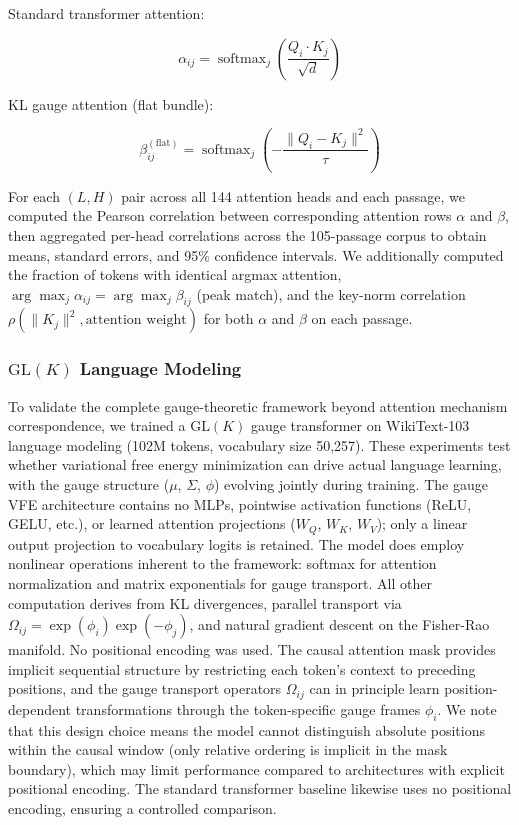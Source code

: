 \documentclass[twoside,11pt]{article}
\begin{document}
Standard transformer attention:

\begin{equation}
\alpha_{ij} = \operatorname{softmax}_j\!\left( \frac{Q_i \cdot K_j}{\sqrt{d}} \right)
\end{equation}

KL gauge attention (flat bundle):

\begin{equation}
\beta^{(\mathrm{flat})}_{ij} = \operatorname{softmax}_j\!\left( -\frac{\|Q_i - K_j\|^2}{\tau} \right)
\end{equation}

For each $(L,H)$ pair across all 144 attention heads and each passage, we computed the Pearson correlation between corresponding attention rows $\alpha$ and $\beta$, then aggregated per-head correlations across the 105-passage corpus to obtain means, standard errors, and 95\% confidence intervals. We additionally computed the fraction of tokens with identical argmax attention, $\arg\max_j \alpha_{ij} = \arg\max_j \beta_{ij}$ (peak match), and the key-norm correlation $\rho(\|K_j\|^2, \text{attention weight})$ for both $\alpha$ and $\beta$ on each passage.

\subsubsection{$\mathrm{GL}(K)$ Language Modeling}
\label{sec:experimental_design_glk}

To validate the complete gauge-theoretic framework beyond attention mechanism correspondence, we trained a $\mathrm{GL}(K)$ gauge transformer on WikiText-103 language modeling (102M tokens, vocabulary size 50,257). These experiments test whether variational free energy minimization can drive actual language learning, with the gauge structure ($\mu$, $\Sigma$, $\phi$) evolving jointly during training. The gauge VFE architecture contains no MLPs, pointwise activation functions (ReLU, GELU, etc.), or learned attention projections ($W_Q$, $W_K$, $W_V$); only a linear output projection to vocabulary logits is retained. The model does employ nonlinear operations inherent to the framework: softmax for attention normalization and matrix exponentials for gauge transport. All other computation derives from KL divergences, parallel transport via $\Omega_{ij} = \exp(\phi_i) \exp(-\phi_j)$, and natural gradient descent on the Fisher-Rao manifold. No positional encoding was used. The causal attention mask provides implicit sequential structure by restricting each token's context to preceding positions, and the gauge transport operators $\Omega_{ij}$ can in principle learn position-dependent transformations through the token-specific gauge frames $\phi_i$. We note that this design choice means the model cannot distinguish absolute positions within the causal window (only relative ordering is implicit in the mask boundary), which may limit performance compared to architectures with explicit positional encoding. The standard transformer baseline likewise uses no positional encoding, ensuring a controlled comparison.
\end{document}

